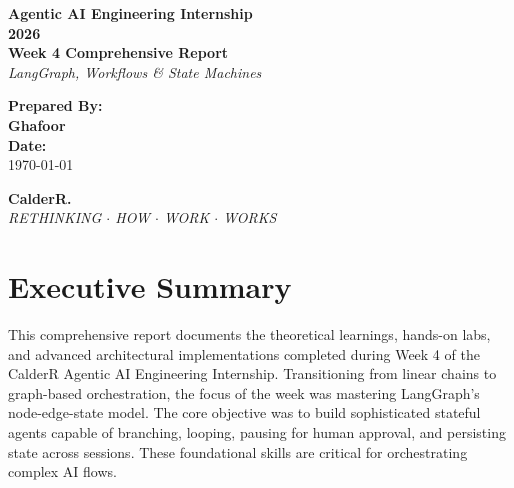 \documentclass[12pt, a4paper]{article}
\begin{document}
\begin{titlepage}
    \centering
    \vspace*{2cm}
    
    {\Huge \textbf{\textcolor{primary}{Agentic AI Engineering Internship}}} \\[0.5cm]
    {\Huge \textbf{\textcolor{primary}{2026}}} \\[1.5cm]
    
    {\LARGE \textbf{Week 4 Comprehensive Report}} \\[0.5cm]
    {\Large \textit{LangGraph, Workflows \& State Machines}} \\[2cm]
    
    \begin{tcolorbox}[colback=accent, colframe=primary, rounded corners, boxrule=1.5pt, width=0.75\textwidth, arc=4mm]
        \centering
        \vspace{0.4cm}
        {\Large \textbf{Prepared By:}} \\[0.2cm]
        {\Large \textbf{Ghafoor}} \\[0.4cm]
        {\large \textbf{Date:}} \\
        {\large \today}
        \vspace{0.4cm}
    \end{tcolorbox}
    
    \vfill
    
    {\huge \textbf{\textcolor{secondary}{CalderR.}}} \\[0.2cm]
    {\large \textit{RETHINKING $\cdot$ HOW $\cdot$ WORK $\cdot$ WORKS}}
    \vspace*{1cm}
\end{titlepage}

\tableofcontents
\newpage

\section{Executive Summary}
This comprehensive report documents the theoretical learnings, hands-on labs, and advanced architectural implementations completed during Week 4 of the CalderR Agentic AI Engineering Internship. Transitioning from linear chains to graph-based orchestration, the focus of the week was mastering LangGraph's node-edge-state model. The core objective was to build sophisticated stateful agents capable of branching, looping, pausing for human approval, and persisting state across sessions. These foundational skills are critical for orchestrating complex AI flows.
\end{document}
